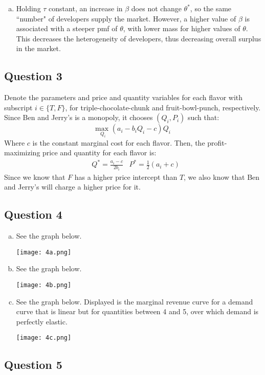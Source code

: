 \documentclass{article}
\newcommand{\usmax}[1]{\underset{#1}{\text{max }}}
\begin{document}
\begin{enumerate}[(a)]
	\item Holding $\tau$ constant, an increase in $\beta$ does not change $\theta^*$, so the same ``number" of developers supply the market. However, a higher value of $\beta$ is associated with a steeper pmf of $\theta$, with lower mass for higher values of $\theta$. This decreases the heterogeneity of developers, thus decreasing overall surplus in the market.
	
\end{enumerate}


\subsection*{Question 3}

Denote the parameters and price and quantity variables for each flavor with subscript $i\in\{T,F\}$, for triple-chocolate-chunk and fruit-bowl-punch, respectively. Since Ben and Jerry's is a monopoly, it chooses $(Q_i,P_i)$ such that:
\[
	\usmax{Q_i}(a_i-b_iQ_i - c)Q_i
\]
Where $c$ is the constant marginal cost for each flavor. Then, the profit-maximizing price and quantity for each flavor is:
\begin{align*}
	&Q^* = \frac{a_i-c}{2b_i} 	&P^* = \frac{1}{2}(a_i + c)
\end{align*}
Since we know that $F$ has a higher price intercept than $T$, we also know that Ben and Jerry's will charge a higher price for it.



\subsection*{Question 4}

\begin{enumerate}[(a)]
	\item See the graph below.
		\begin{center}
			\texttt{[image: 4a.png]}
		\end{center}
	
	\item See the graph below.
		\begin{center}
			\texttt{[image: 4b.png]}
		\end{center}
	
	\item See the graph below. Displayed is the marginal revenue curve for a demand curve that is linear but for quantities between 4 and 5, over which demand is perfectly elastic.
		\begin{center}
			\texttt{[image: 4c.png]}
		\end{center}
	
\end{enumerate}



\pagebreak
\subsection*{Question 5}




\end{document}
